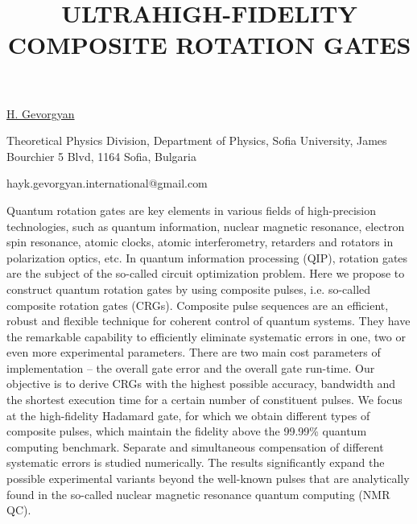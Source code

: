 \title{ULTRAHIGH-FIDELITY COMPOSITE ROTATION GATES}

\underline{H. Gevorgyan}  

{\normalsize{\vspace{-4mm}
Theoretical Physics Division,
Department of Physics, Sofia University,
James Bourchier 5 Blvd, 1164 Sofia, Bulgaria



\email hayk.gevorgyan.international@gmail.com}}

Quantum rotation gates are key elements in various fields of high-precision technologies, such as quantum information, nuclear magnetic resonance, electron spin resonance, atomic clocks, atomic interferometry, retarders and rotators in polarization optics, etc. In quantum information processing (QIP), rotation gates are the subject of the so-called circuit optimization problem. Here we propose to construct quantum rotation gates by using composite pulses, i.e. so-called composite rotation gates (CRGs). Composite pulse sequences are an efficient, robust and flexible technique for coherent control of quantum systems. They have the remarkable capability to efficiently eliminate systematic errors in one, two or even more experimental parameters. There are two main cost parameters of implementation – the overall gate error and the overall gate run-time. Our objective is to derive CRGs with the highest possible accuracy, bandwidth and the shortest execution time for a certain number of constituent pulses. We focus at the high-fidelity Hadamard gate, for which we obtain different types of composite pulses, which maintain the fidelity above the 99.99\% quantum computing benchmark. Separate and simultaneous compensation of different systematic errors is studied numerically. The results significantly expand the possible experimental variants beyond the well-known pulses that are analytically found in the so-called nuclear magnetic resonance quantum computing (NMR QC).

\vspace{\baselineskip}